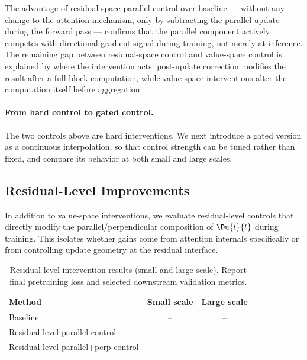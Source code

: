 The advantage of residual-space parallel control over baseline — without any change
to the attention mechanism, only by subtracting the parallel update during
the forward pass — confirms that the parallel component actively competes
with directional gradient signal during training, not merely at inference.
The remaining gap between residual-space control and value-space control is
explained by where the intervention acts: post-update correction modifies the
result after a full block computation, while value-space interventions alter
the computation itself before aggregation.

\paragraph{From hard control to gated control.}
The two controls above are hard interventions.  We next introduce a gated
version as a continuous interpolation, so that control strength can be tuned
rather than fixed, and compare its behavior at both small and large scales.

\subsection{Residual-Level Improvements}
\label{sec:residual-improve}

In addition to value-space interventions, we evaluate residual-level controls
that directly modify the parallel/perpendicular composition of
$\Du{l}{t}$ during training.  This isolates whether gains come from attention
internals specifically or from controlling update geometry at the residual
interface.

\begin{table}[t]
  \caption{Residual-level intervention results (small and large scale).
           Report final pretraining loss and selected downstream validation
           metrics.}
  \label{tab:residual-level}
  \centering
  \small
  \begin{tabular}{lcc}
    \toprule
    Method & Small scale & Large scale \\
    \midrule
    Baseline & -- & -- \\
    Residual-level parallel control & -- & -- \\
    Residual-level parallel+perp control & -- & -- \\
    \bottomrule
  \end{tabular}
\end{table}

